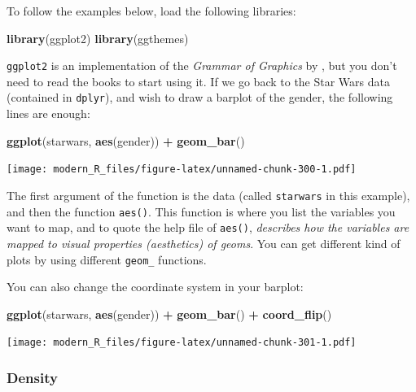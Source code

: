 \documentclass[]{gitbook}
\newenvironment{Shaded}{\begin{snugshade}}{\end{snugshade}}
\newcommand{\KeywordTok}[1]{\textcolor[rgb]{0.13,0.29,0.53}{\textbf{#1}}}
\newcommand{\NormalTok}[1]{#1}
\newcommand{\OperatorTok}[1]{\textcolor[rgb]{0.81,0.36,0.00}{\textbf{#1}}}
\newcommand{\StringTok}[1]{\textcolor[rgb]{0.31,0.60,0.02}{#1}}
\theoremstyle{definition}
\theoremstyle{definition}
\theoremstyle{definition}
\theoremstyle{remark}
\begin{document}
To follow the examples below, load the following libraries:

\begin{Shaded}
\begin{Highlighting}[]
\KeywordTok{library}\NormalTok{(ggplot2)}
\KeywordTok{library}\NormalTok{(ggthemes)}
\end{Highlighting}
\end{Shaded}

\texttt{ggplot2} is an implementation of the \emph{Grammar of Graphics}
by \citet{wilkinson2006}, but you don't need to read the books to start
using it. If we go back to the Star Wars data (contained in
\texttt{dplyr}), and wish to draw a barplot of the gender, the following
lines are enough:

\begin{Shaded}
\begin{Highlighting}[]
\KeywordTok{ggplot}\NormalTok{(starwars, }\KeywordTok{aes}\NormalTok{(gender)) }\OperatorTok{+}
\StringTok{  }\KeywordTok{geom_bar}\NormalTok{()}
\end{Highlighting}
\end{Shaded}

\texttt{[image: modern\_R\_files/figure-latex/unnamed-chunk-300-1.pdf]}

The first argument of the function is the data (called \texttt{starwars}
in this example), and then the function \texttt{aes()}. This function is
where you list the variables you want to map, and to quote the help file
of \texttt{aes()}, \emph{describes how the variables are mapped to
visual properties (aesthetics) of geoms}. You can get different kind of
plots by using different \texttt{geom\_} functions.

You can also change the coordinate system in your barplot:

\begin{Shaded}
\begin{Highlighting}[]
\KeywordTok{ggplot}\NormalTok{(starwars, }\KeywordTok{aes}\NormalTok{(gender)) }\OperatorTok{+}
\StringTok{  }\KeywordTok{geom_bar}\NormalTok{() }\OperatorTok{+}
\StringTok{  }\KeywordTok{coord_flip}\NormalTok{()}
\end{Highlighting}
\end{Shaded}

\texttt{[image: modern\_R\_files/figure-latex/unnamed-chunk-301-1.pdf]}

\hypertarget{density}{%
\subsubsection{Density}\label{density}}
\end{document}

